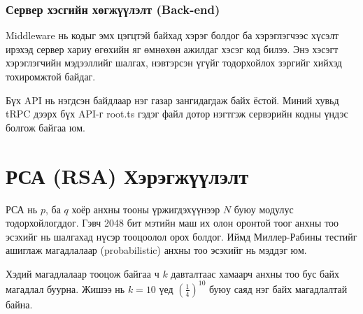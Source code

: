 \subsubsection[Back-end]{Сервер хэсгийн хөгжүүлэлт (Back-end)}
Middleware нь кодыг эмх цэгцтэй байхад хэрэг болдог ба хэрэглэгчээс хүсэлт ирэхэд сервер хариу өгөхийн яг өмнөхөн ажилдаг хэсэг код билээ. Энэ хэсэгт хэрэглэгчийн мэдээллийг шалгах, нэвтэрсэн үгүйг тодорхойлох зэргийг хийхэд тохиромжтой байдаг.

Бүх API нь нэгдсэн байдлаар нэг газар зангидагдаж байх ёстой. Миний хувьд tRPC дээрх бүх API-г root.ts гэдэг файл дотор нэгтгэж сервэрийн кодны үндэс болгож байгаа юм.


\section{РСА (RSA) Хэрэгжүүлэлт}
РСА нь $p$, ба  $q$ хоёр анхны тооны үржигдэхүүнээр $N$ буюу модулус тодорхойлогддог. Гэвч 2048 бит мэтийн маш их олон оронтой тоог анхны тоо эсэхийг нь шалгахад нүсэр тооцоолол орох болдог. Иймд Миллер-Рабины тестийг ашиглаж магадлалаар (probabilistic) анхны тоо эсэхийг нь мэддэг юм. 




Хэдий магадлалаар тооцож байгаа ч $k$ давталтаас хамаарч анхны тоо бус байх магадлал буурна. Жишээ нь $k = 10$ үед $\left(\frac{1}{4}\right)^{10}$ буюу саяд нэг байх магадлалтай байна.






